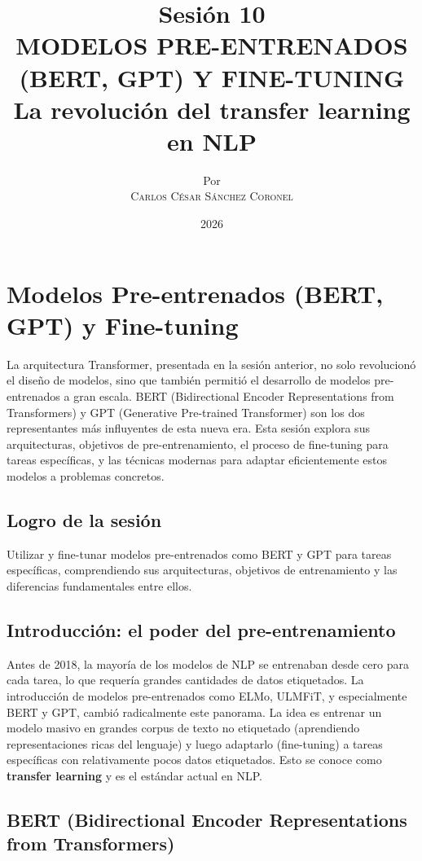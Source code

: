 \documentclass[12pt,a4paper,openany,oneside]{book}
\title{
    \textbf{Sesión 10} \\ 
    \Huge \textbf{MODELOS PRE-ENTRENADOS (BERT, GPT) Y FINE-TUNING} \\
    \Large La revolución del transfer learning en NLP
}
\author{
    \small Por \\ \vspace{0.2cm}
    \Large \textsc{Carlos César Sánchez Coronel}
}
\date{2026}
\begin{document}
\maketitle
\tableofcontents
{}

\chapter{Modelos Pre-entrenados (BERT, GPT) y Fine-tuning}

La arquitectura Transformer, presentada en la sesión anterior, no solo revolucionó el diseño de modelos, sino que también permitió el desarrollo de modelos pre-entrenados a gran escala. BERT (Bidirectional Encoder Representations from Transformers) y GPT (Generative Pre-trained Transformer) son los dos representantes más influyentes de esta nueva era. Esta sesión explora sus arquitecturas, objetivos de pre-entrenamiento, el proceso de fine-tuning para tareas específicas, y las técnicas modernas para adaptar eficientemente estos modelos a problemas concretos.

\section{Logro de la sesión}
Utilizar y fine-tunar modelos pre-entrenados como BERT y GPT para tareas específicas, comprendiendo sus arquitecturas, objetivos de entrenamiento y las diferencias fundamentales entre ellos.

\section{Introducción: el poder del pre-entrenamiento}
Antes de 2018, la mayoría de los modelos de NLP se entrenaban desde cero para cada tarea, lo que requería grandes cantidades de datos etiquetados. La introducción de modelos pre-entrenados como ELMo, ULMFiT, y especialmente BERT y GPT, cambió radicalmente este panorama. La idea es entrenar un modelo masivo en grandes corpus de texto no etiquetado (aprendiendo representaciones ricas del lenguaje) y luego adaptarlo (fine-tuning) a tareas específicas con relativamente pocos datos etiquetados. Esto se conoce como \textbf{transfer learning} y es el estándar actual en NLP.

\section{BERT (Bidirectional Encoder Representations from Transformers)}
\end{document}
